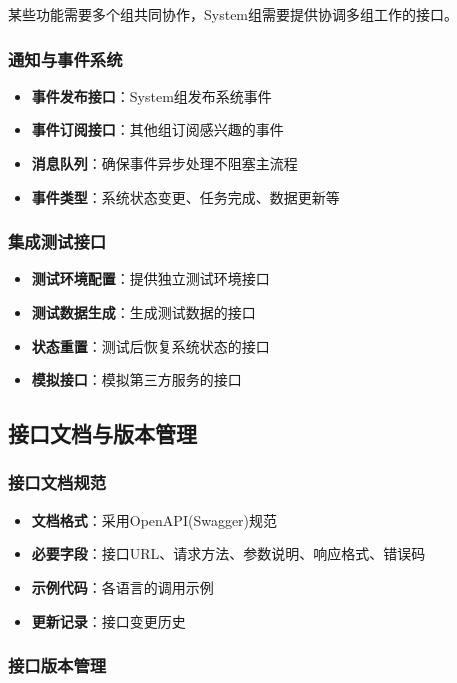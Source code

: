\documentclass[a4paper,12pt]{article}
\begin{document}
某些功能需要多个组共同协作，System组需要提供协调多组工作的接口。

\subsubsection{通知与事件系统}

\begin{itemize}
  \item \textbf{事件发布接口}：System组发布系统事件
  \item \textbf{事件订阅接口}：其他组订阅感兴趣的事件
  \item \textbf{消息队列}：确保事件异步处理不阻塞主流程
  \item \textbf{事件类型}：系统状态变更、任务完成、数据更新等
\end{itemize}

\subsubsection{集成测试接口}

\begin{itemize}
  \item \textbf{测试环境配置}：提供独立测试环境接口
  \item \textbf{测试数据生成}：生成测试数据的接口
  \item \textbf{状态重置}：测试后恢复系统状态的接口
  \item \textbf{模拟接口}：模拟第三方服务的接口
\end{itemize}

\subsection{接口文档与版本管理}

\subsubsection{接口文档规范}

\begin{itemize}
  \item \textbf{文档格式}：采用OpenAPI(Swagger)规范
  \item \textbf{必要字段}：接口URL、请求方法、参数说明、响应格式、错误码
  \item \textbf{示例代码}：各语言的调用示例
  \item \textbf{更新记录}：接口变更历史
\end{itemize}

\subsubsection{接口版本管理}
\end{document}
